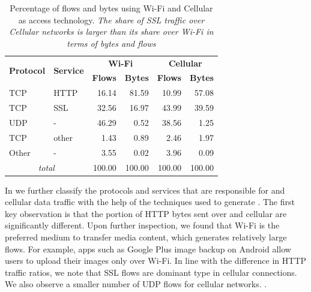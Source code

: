 \begin{table}
\begin{center}
\begin{small}
\begin{tabular}{|l|l|r|r|r|r|}
\hline
\multirow{2}{*}{\bf Protocol} & \multirow{2}{*}{\bf Service} & \multicolumn{2}{|c|}{\bf Wi-Fi} & \multicolumn{2}{|c|}{\bf Cellular} \tabularnewline
\cline{3-6}
           &           &  \textbf{Flows}  &  \textbf{Bytes}  &  \textbf{Flows}  &  \textbf{Bytes}  \tabularnewline
\hline
 TCP       &  HTTP     &  16.14  &  81.59  &  10.99 &  57.08\tabularnewline
\hline
 TCP       &  SSL      &  32.56  &  16.97  &  43.99 &  39.59 \tabularnewline
\hline
UDP       &  -        &  46.29  &   0.52  &  38.56  &  1.25  \tabularnewline
\hline
TCP       &  other    &   1.43 &   0.89  &   2.46  &   1.97  \tabularnewline
\hline
Other     &  -        &   3.55 &  0.02  &   3.96 &   0.09  \tabularnewline
\hline
\multicolumn{2}{|c|}{\emph{total}} & 100.00 & 100.00 & 100.00 & 100.00 \tabularnewline
\hline
\end{tabular}
\end{small}
\end{center}
\caption{Percentage of flows and bytes using Wi-Fi and Cellular as access technology.  \emph{The share of SSL traffic over Cellular
    networks is larger than its share over Wi-Fi in terms of bytes and flows}}
\label{tab:summaryWifiCellularTraffic}
\end{table}

In  we further classify the protocols and services that are responsible for \wifi and cellular data traffic with the help of the techniques used to generate . 
The first key observation is that the portion of HTTP bytes sent over \wifi and cellular are significantly different. 
Upon further inspection, we found that Wi-Fi is the preferred medium to transfer media content, which generates relatively large flows. 
For example, apps such as Google Plus image backup on Android allow users to upload their
images only over Wi-Fi. 
In line with the difference in HTTP traffic ratios, we note that SSL flows are dominant type in cellular connections. 
We also observe a smaller number of UDP flows for cellular networks. 
.

